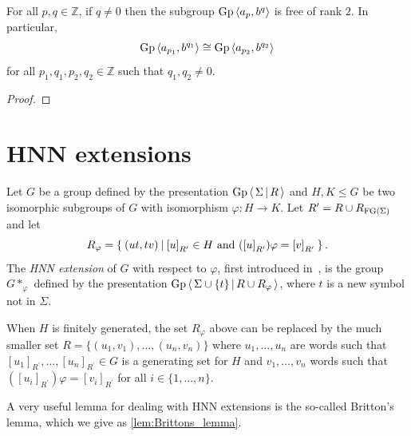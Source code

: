 \begin{theorem}\label{thm:subgroup_ap_bq_is_free}
  \rocqok{}
  For all $p, q\in \mathbb{Z}$, if $q\neq 0$ then the subgroup
  $\textrm{Gp}\left\langle a_p, b^q \right\rangle$ is free of rank $2$.
  In particular,
  \[
    \textrm{Gp}\left\langle a_{p_1}, b^{q_1} \right\rangle \cong
    \textrm{Gp}\left\langle a_{p_2}, b^{q_2} \right\rangle
  \]
  for all $p_1, q_1, p_2, q_2\in \mathbb{Z}$ such that $q_1, q_2\neq 0$.
\end{theorem}
\begin{proof}
  \rocqok{}
\end{proof}

\chapter{HNN extensions}

\begin{definition}%
  \label{def:HNN_extension}
Let $G$ be a group defined by the presentation $\textrm{Gp} \left\langle\, \Sigma \,\middle|\, R \,\right\rangle$ and $H, K \leq G$ be two
isomorphic subgroups of $G$ with isomorphism $\varphi: H \rightarrow K$.
Let $R^\prime = R\cup R_{\textrm{FG}(\Sigma)}$ and let
\[
  R_{\varphi} =
  \left\{\: 
    (ut, tv)
   \: \middle|\: 
    {[u]}_{R^\prime} \in H \textrm{ and }
    ({[u]}_{R^\prime})\varphi = {[v]}_{R^\prime}
   \:\right\}.
\]
The \emph{HNN extension} of $G$ with respect to $\varphi$, first introduced
in~\cite{Higman1949aa}, is the group $G\ast_{\varphi}$ defined by the presentation
$\textrm{Gp}\left\langle\, \Sigma \cup\{t\} \,\middle|\, R\cup R_\varphi \,\right\rangle$,
where $t$ is a new symbol not in $\Sigma$.
\end{definition}
When $H$ is finitely generated, the set $R_\varphi$ above can be replaced by the much smaller set
$R = \{(u_1, v_1), \ldots, (u_n, v_n)\}$ where $u_1, \ldots, u_n$ are words such that
${[u_1]}_{R^\prime}, \ldots, {[u_n]}_{R^\prime}\in G$ is a generating set for $H$ and
$v_1, \ldots, v_n$ words such that $({[u_i]}_{R^\prime})\varphi = {[v_i]}_{R^\prime}$ for all $i \in \{1, \ldots, n\}$.

A very useful lemma for dealing with HNN extensions is the so-called Britton's lemma, which we
give as \cref{lem:Brittons_lemma}.

